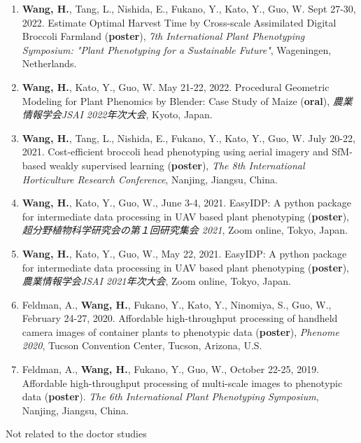 \begin{enumerate}
  \item \textbf{Wang, H.}, Tang, L., Nishida, E., Fukano, Y., Kato, Y., Guo, W. Sept 27-30, 2022. Estimate Optimal Harvest Time by Cross-scale Assimilated Digital Broccoli Farmland (\textbf{poster}), \textit{7th International Plant Phenotyping Symposium: "Plant Phenotyping for a Sustainable Future"}, Wageningen, Netherlands.
  \item \textbf{Wang, H.}, Kato, Y., Guo, W. May 21-22, 2022. Procedural Geometric Modeling for Plant Phenomics by Blender: Case Study of Maize (\textbf{oral}), \textit{農業情報学会JSAI 2022年次大会}, Kyoto, Japan.
  \item \textbf{Wang, H.}, Tang, L., Nishida, E., Fukano, Y., Kato, Y., Guo, W. July 20-22, 2021. Cost-efficient broccoli head phenotyping using aerial imagery and SfM-based weakly supervised learning (\textbf{poster}), \textit{The 8th International Horticulture Research Conference}, Nanjing, Jiangsu, China.
  \item \textbf{Wang, H.}, Kato, Y., Guo, W., June 3-4, 2021. EasyIDP: A python package for intermediate data processing in UAV based plant phenotyping (\textbf{poster}), \textit{超分野植物科学研究会の第１回研究集会 2021}, Zoom online, Tokyo, Japan.
  \item \textbf{Wang, H.}, Kato, Y., Guo, W., May 22, 2021. EasyIDP: A python package for intermediate data processing in UAV based plant phenotyping (\textbf{poster}), \textit{農業情報学会JSAI 2021年次大会}, Zoom online, Tokyo, Japan.
  \item Feldman, A., \textbf{Wang, H.}, Fukano, Y., Kato, Y., Ninomiya, S., Guo, W., February 24-27, 2020. Affordable high-throughput processing of handheld camera images of container plants to phenotypic data (\textbf{poster}), \textit{Phenome 2020}, Tucson Convention Center, Tucson, Arizona, U.S.
  \item Feldman, A., \textbf{Wang, H.}, Fukano, Y., Guo, W., October 22-25, 2019. Affordable high-throughput processing of multi-scale images to phenotypic data (\textbf{poster}). \textit{The 6th International Plant Phenotyping Symposium}, Nanjing, Jiangsu, China.
\end{enumerate}

\noindent
Not related to the doctor studies

